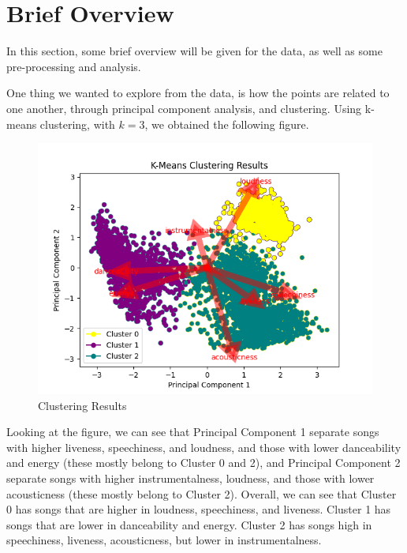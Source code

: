 \section{Brief Overview}

In this section, some brief overview will be given for the data, as well as some pre-processing and analysis.

One thing we wanted to explore from the data, is how the points are related to one another, through principal component analysis, and clustering. Using k-means clustering, with $k = 3$, we obtained the following figure.

\begin{figure}[H] %
    \centering
    \includegraphics[width=1\linewidth]{kmeanscluster.png}
    \caption{Clustering Results}
\end{figure}

Looking at the figure, we can see that Principal Component 1 separate songs with higher liveness, speechiness, and loudness, and those with lower danceability and energy (these mostly belong to Cluster 0 and 2), and Principal Component 2 separate songs with higher instrumentalness, loudness, and those with lower acousticness (these mostly belong to Cluster 2). Overall, we can see that Cluster 0 has songs that are higher in loudness, speechiness, and liveness. Cluster 1 has songs that are lower in danceability and energy. Cluster 2 has songs high in speechiness, liveness, acousticness, but lower in instrumentalness.